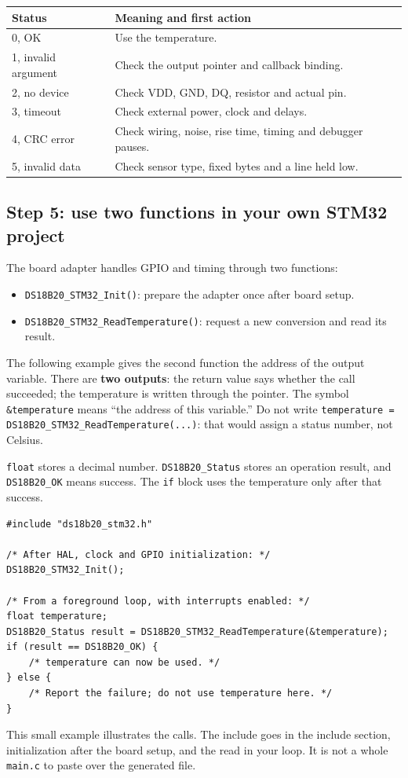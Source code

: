 \begin{center}
\begin{tabular}{p{35mm}p{94mm}}
\toprule
Status & Meaning and first action\\
\midrule
0, OK & Use the temperature.\\
1, invalid argument & Check the output pointer and callback binding.\\
2, no device & Check VDD, GND, DQ, resistor and actual pin.\\
3, timeout & Check external power, clock and delays.\\
4, CRC error & Check wiring, noise, rise time, timing and debugger pauses.\\
5, invalid data & Check sensor type, fixed bytes and a line held low.\\
\bottomrule
\end{tabular}
\end{center}

\subsection{Step 5: use two functions in your own STM32 project}
The board adapter handles GPIO and timing through two functions:
\begin{itemize}
\item \texttt{DS18B20\_STM32\_Init()}: prepare the adapter once after board setup.
\item \texttt{DS18B20\_STM32\_ReadTemperature()}: request a new conversion and read its result.
\end{itemize}
The following example gives the second function the address of the output variable.
There are \textbf{two outputs}: the return value says whether the call succeeded; the temperature is written through the pointer. The symbol \texttt{\&temperature} means ``the address of this variable.'' Do not write \texttt{temperature = DS18B20\_STM32\_ReadTemperature(...)}: that would assign a status number, not Celsius.

\texttt{float} stores a decimal number. \texttt{DS18B20\_Status} stores an operation result, and \texttt{DS18B20\_OK} means success. The \texttt{if} block uses the temperature only after that success.

\begin{lstlisting}
#include "ds18b20_stm32.h"

/* After HAL, clock and GPIO initialization: */
DS18B20_STM32_Init();

/* From a foreground loop, with interrupts enabled: */
float temperature;
DS18B20_Status result = DS18B20_STM32_ReadTemperature(&temperature);
if (result == DS18B20_OK) {
    /* temperature can now be used. */
} else {
    /* Report the failure; do not use temperature here. */
}
\end{lstlisting}
This small example illustrates the calls. The include goes in the include section, initialization after the board setup, and the read in your loop. It is not a whole \texttt{main.c} to paste over the generated file.



